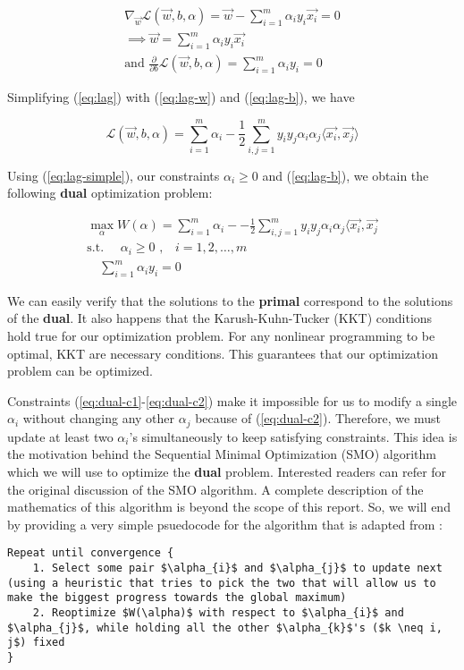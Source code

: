 \begin{gather}
\nabla_{\vec{w}}\mathcal{L}(\vec{w}, b, \alpha) = \vec{w} - \sum_{i = 1}^{m}\alpha_{i}y_{i}\vec{x_i} = 0 \nonumber \\
\implies \vec{w} = \sum_{i = 1}^{m}\alpha_{i}y_{i}\vec{x_i} \label{eq:lag-w}\\
\text{and } \frac{\partial}{\partial b}\mathcal{L}(\vec{w}, b, \alpha) = \sum_{i = 1}^{m}\alpha_{i}y_{i} = 0 \label{eq:lag-b}
\end{gather}

Simplifying (\ref{eq:lag}) with (\ref{eq:lag-w}) and (\ref{eq:lag-b}), we have

\begin{equation}
\mathcal{L}(\vec{w}, b, \alpha) = \sum_{i = 1}^{m}\alpha_{i} - \frac{1}{2}\sum_{i,j = 1}^{m}y_{i}y_{j}\alpha_{i}\alpha_{j}\langle\vec{x_i}, \vec{x_j}\rangle \label{eq:lag-simple}
\end{equation}

Using (\ref{eq:lag-simple}), our constraints $\alpha_{i} \geq 0$ and (\ref{eq:lag-b}), we obtain the following \textbf{dual} optimization problem:

\begin{gather}
\max_{\alpha} W(\alpha) = \sum_{i = 1}^{m}\alpha_{i} - - \frac{1}{2}\sum_{i,j = 1}^{m}y_{i}y_{j}\alpha_{i}\alpha_{j}\langle\vec{x_i}, \vec{x_j} \label{eq:dual} \\
\text{s.t. } \quad\alpha_{i} \geq 0\text{ ,}\quad\text{$i = 1, 2, \dots , m$} \label{eq:dual-c1} \\
\quad \sum_{i = 1}^{m}\alpha_{i}y_{i} = 0 \label{eq:dual-c2}
\end{gather}

We can easily verify that the solutions to the \textbf{primal} correspond to the solutions of the \textbf{dual}. It also happens that the Karush-Kuhn-Tucker (KKT) conditions hold true for our optimization problem. For any nonlinear programming to be optimal, KKT are necessary conditions. This guarantees that our optimization problem can be optimized.

Constraints (\ref{eq:dual-c1}-\ref{eq:dual-c2}) make it impossible for us to modify a single $\alpha_i$  without changing any other $\alpha_j$ because of (\ref{eq:dual-c2}). Therefore, we must update at least two $\alpha_i$'s simultaneously to keep satisfying constraints. This idea is the motivation behind the Sequential Minimal Optimization (SMO) algorithm which we will use to optimize the \textbf{dual} problem. Interested readers can refer \cite{smo-algorithm} for the original discussion of the SMO algorithm. A complete description of the mathematics of this algorithm is beyond the scope of this report. So, we will end by providing a very simple psuedocode for the algorithm that is adapted from \cite{svm-andrew-ng}:
\newline
\begin{lstlisting}
Repeat until convergence {
	1. Select some pair $\alpha_{i}$ and $\alpha_{j}$ to update next (using a heuristic that tries to pick the two that will allow us to make the biggest progress towards the global maximum)
	2. Reoptimize $W(\alpha)$ with respect to $\alpha_{i}$ and $\alpha_{j}$, while holding all the other $\alpha_{k}$'s ($k \neq i, j$) fixed
}
\end{lstlisting}